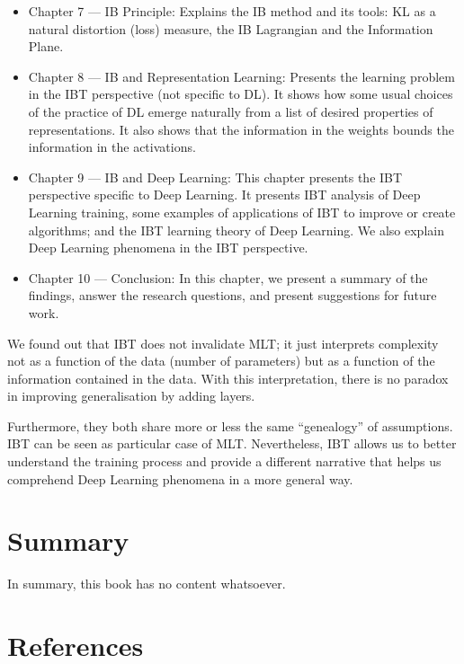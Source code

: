 \documentclass[
  a4paperpaper,
  a4paper,
  12pt,
  twoside,
  brazil,
  british,
  open=right]{scrbook}
\begin{document}
\begin{enumerate}
  \begin{itemize}
  \item
    Chapter 7 --- IB Principle: Explains the IB method and its tools:
    {KL} as a natural distortion (loss) measure, the IB Lagrangian and
    the Information Plane.
  \item
    Chapter 8 --- IB and Representation Learning: Presents the learning
    problem in the {IBT} perspective (not specific to {DL}). It shows
    how some usual choices of the practice of {DL} emerge naturally from
    a list of desired properties of representations. It also shows that
    the information in the weights bounds the information in the
    activations.
  \item
    Chapter 9 --- IB and Deep Learning: This chapter presents the {IBT}
    perspective specific to Deep Learning. It presents {IBT} analysis of
    Deep Learning training, some examples of applications of {IBT} to
    improve or create algorithms; and the {IBT} learning theory of Deep
    Learning. We also explain Deep Learning phenomena in the {IBT}
    perspective.
  \item
    Chapter 10 --- Conclusion: In this chapter, we present a summary of
    the findings, answer the research questions, and present suggestions
    for future work.
  \end{itemize}
\end{enumerate}

We found out that {IBT} does not invalidate {MLT}; it just interprets
complexity not as a function of the data (number of parameters) but as a
function of the information contained in the data. With this
interpretation, there is no paradox in improving generalisation by
adding layers.

Furthermore, they both share more or less the same ``genealogy'' of
assumptions. {IBT} can be seen as particular case of {MLT}.
Nevertheless, {IBT} allows us to better understand the training process
and provide a different narrative that helps us comprehend Deep Learning
phenomena in a more general way.


\hypertarget{summary}{%
\chapter{Summary}\label{summary}}

In summary, this book has no content whatsoever.


\hypertarget{references}{%
\chapter*{References}\label{references}}




\backmatter
\end{document}
